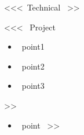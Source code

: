 \documentclass[10pt,a4paper,ragged2e]{altacv}
\begin{document}
<<<~Technical~  >>


<<< ~Project~
\begin{itemize}
\item ~point1~
\item ~point2~
\item ~point3~
\end{itemize}
\divider
>>


\begin{itemize}
<<< ~Achievement~
\item ~point~
>>
\end{itemize}





% 
% 
% 
% 
% 
% 
% 
\end{document}
